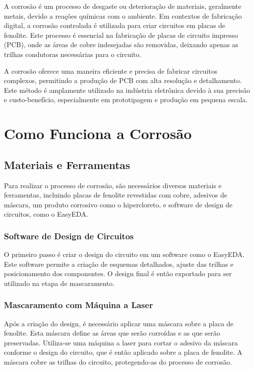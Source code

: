 \documentclass[
]{book}
\begin{document}
A corrosão é um processo de desgaste ou deterioração de materiais, geralmente metais, devido a reações químicas com o ambiente. Em contextos de fabricação digital, a corrosão controlada é utilizada para criar circuitos em placas de fenolite. Este processo é essencial na fabricação de placas de circuito impresso (PCB), onde as áreas de cobre indesejadas são removidas, deixando apenas as trilhas condutoras necessárias para o circuito.

A corrosão oferece uma maneira eficiente e precisa de fabricar circuitos complexos, permitindo a produção de PCB com alta resolução e detalhamento. Este método é amplamente utilizado na indústria eletrônica devido à sua precisão e custo-benefício, especialmente em prototipagem e produção em pequena escala.

\section{Como Funciona a Corrosão}\label{como-funciona-a-corrosuxe3o}

\subsection{Materiais e Ferramentas}\label{materiais-e-ferramentas}

Para realizar o processo de corrosão, são necessários diversos materiais e ferramentas, incluindo placas de fenolite revestidas com cobre, adesivos de máscara, um produto corrosivo como o hipercloreto, e software de design de circuitos, como o EasyEDA.

\subsubsection{Software de Design de Circuitos}\label{software-de-design-de-circuitos}

O primeiro passo é criar o design do circuito em um software como o EasyEDA. Este software permite a criação de esquemas detalhados, ajuste das trilhas e posicionamento dos componentes. O design final é então exportado para ser utilizado na etapa de mascaramento.

\subsubsection{Mascaramento com Máquina a Laser}\label{mascaramento-com-muxe1quina-a-laser}

Após a criação do design, é necessário aplicar uma máscara sobre a placa de fenolite. Esta máscara define as áreas que serão corroídas e as que serão preservadas. Utiliza-se uma máquina a laser para cortar o adesivo da máscara conforme o design do circuito, que é então aplicado sobre a placa de fenolite. A máscara cobre as trilhas do circuito, protegendo-as do processo de corrosão.
\end{document}
